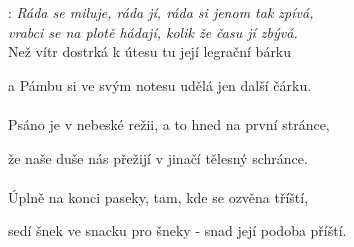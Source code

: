 
\textregistered: \emph{Ráda se miluje, ráda jí,
ráda si jenom tak zpívá,\\
vrabci se na plotě hádají,
kolik že času jí zbývá.}\\

Než vítr dostrká k útesu tu její legrační bárku

a Pámbu si ve svým notesu udělá jen další čárku.\\

\textregistered\\

Psáno je v nebeské režii, a to hned na první stránce,

že naše duše nás přežijí v jinačí tělesný schránce.\\

\textregistered\\

Úplně na konci paseky, tam, kde se ozvěna tříští,

sedí šnek ve snacku pro šneky - snad její podoba příští.\\

\textregistered

\newpage

